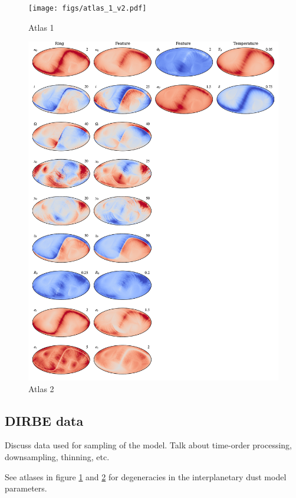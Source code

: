 \documentclass{aa}
\begin{document}
\begin{figure}
  \centering
   	\texttt{[image: figs/atlas\_1\_v2.pdf]}
  	\caption{Atlas 1}
	\label{fig: atlas1}
\end{figure}

\begin{figure}
    \centering
         \includegraphics[width=0.8\linewidth]{figs/atlas_2_v2.pdf}
        \caption{Atlas 2}
      \label{fig: atlas2}
  \end{figure}


\subsection{DIRBE data}
Discuss data used for sampling of the model. Talk about time-order processing, downsampling, thinning, etc.

See atlases in figure \ref{fig: atlas1} and \ref{fig: atlas2} for degeneracies in the interplanetary dust model parameters.
\end{document}
